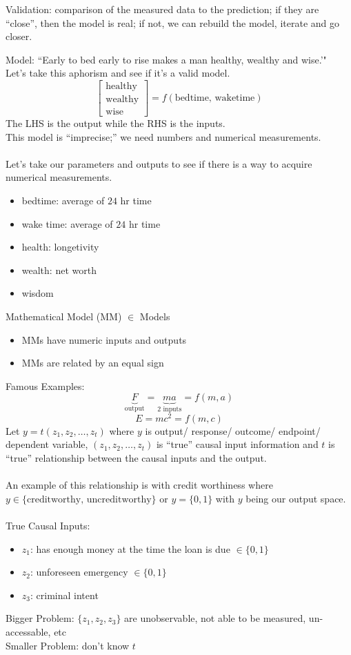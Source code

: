 \documentclass[12pt]{article}
\begin{document}
\begin{definition} Validation: comparison of the measured data to the prediction; if they are ``close'', then the model is real; if not, we can rebuild the model, iterate and go closer. \end{definition} 

Model: ``Early to bed early to rise makes a man healthy, wealthy and wise.'" \\
Let's take this aphorism and see if it's a valid model. 
$$ \begin{bmatrix} \text{healthy} \\ \text{wealthy} \\ \text{wise} \end{bmatrix} = f(\text{bedtime, waketime})$$ 
The LHS is the output while the RHS is the inputs. \\
This model is ``imprecise;'' we need numbers and numerical measurements. \\~\\
Let's take our parameters and outputs to see if there is a way to acquire numerical measurements. 
 \begin{itemize} 
\item bedtime: average of $24$ hr time 
\item wake time: average of $24$ hr time 
\item health: longetivity 
\item wealth: net worth 
\item wisdom \end{itemize} 
Mathematical Model (MM) $\in$ Models \begin{itemize} 
\item MMs have numeric inputs and outputs 
\item MMs are related by an equal sign \end{itemize} 
Famous Examples: $$ \underbrace{F}_{\text{output}} = \underbrace{ma}_{2 \text{ inputs}} = f(m,a)$$
$$ E = mc^2 = f(m,c)$$ 
Let $y = t(z_1,z_2,\dots,z_t)$ where $y$ is output/ response/ outcome/ endpoint/ dependent variable, $(z_1,z_2,\dots, z_t)$ is ``true'' causal input information and $t$ is ``true'' relationship between the causal inputs and the output. \\~\\
An example of this relationship is with credit worthiness where $y \in \{ \text{creditworthy, uncreditworthy}\}$ or $y = \{0,1\}$ with $y$ being our output space. \\~\\
True Causal Inputs: \begin{itemize} 
\item $z_1$: has enough money at the time the loan is due $\in \{0,1\}$
\item $z_2$: unforeseen emergency $\in \{0,1\}$
\item $z_3$: criminal intent \end{itemize} 
Bigger Problem: $\{z_1,z_2,z_3\}$ are unobservable, not able to be measured, un-accessable, etc \\
Smaller Problem: don't know $t$ 
\end{document}
